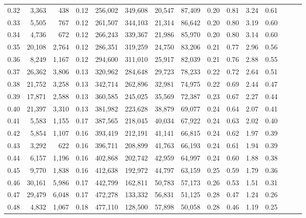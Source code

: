 \begin{tabular}{rrrrrrrrrrrrrrr}
0.32 &   3,363 &    438 &  0.12 &  256,002 &  349,608 &   20,547 &   87,409 &  0.20 &  0.81 &  3.24 &      0.61 \\
0.33 &   5,505 &    767 &  0.12 &  261,507 &  344,103 &   21,314 &   86,642 &  0.20 &  0.80 &  3.19 &      0.60 \\
0.34 &   4,736 &    672 &  0.12 &  266,243 &  339,367 &   21,986 &   85,970 &  0.20 &  0.80 &  3.14 &      0.60 \\
0.35 &  20,108 &  2,764 &  0.12 &  286,351 &  319,259 &   24,750 &   83,206 &  0.21 &  0.77 &  2.96 &      0.56 \\
0.36 &   8,249 &  1,167 &  0.12 &  294,600 &  311,010 &   25,917 &   82,039 &  0.21 &  0.76 &  2.88 &      0.55 \\
0.37 &  26,362 &  3,806 &  0.13 &  320,962 &  284,648 &   29,723 &   78,233 &  0.22 &  0.72 &  2.64 &      0.51 \\
0.38 &  21,752 &  3,258 &  0.13 &  342,714 &  262,896 &   32,981 &   74,975 &  0.22 &  0.69 &  2.44 &      0.47 \\
0.39 &  17,871 &  2,588 &  0.13 &  360,585 &  245,025 &   35,569 &   72,387 &  0.23 &  0.67 &  2.27 &      0.44 \\
0.40 &  21,397 &  3,310 &  0.13 &  381,982 &  223,628 &   38,879 &   69,077 &  0.24 &  0.64 &  2.07 &      0.41 \\
0.41 &   5,583 &  1,155 &  0.17 &  387,565 &  218,045 &   40,034 &   67,922 &  0.24 &  0.63 &  2.02 &      0.40 \\
0.42 &   5,854 &  1,107 &  0.16 &  393,419 &  212,191 &   41,141 &   66,815 &  0.24 &  0.62 &  1.97 &      0.39 \\
0.43 &   3,292 &    622 &  0.16 &  396,711 &  208,899 &   41,763 &   66,193 &  0.24 &  0.61 &  1.94 &      0.39 \\
0.44 &   6,157 &  1,196 &  0.16 &  402,868 &  202,742 &   42,959 &   64,997 &  0.24 &  0.60 &  1.88 &      0.38 \\
0.45 &   9,770 &  1,838 &  0.16 &  412,638 &  192,972 &   44,797 &   63,159 &  0.25 &  0.59 &  1.79 &      0.36 \\
0.46 &  30,161 &  5,986 &  0.17 &  442,799 &  162,811 &   50,783 &   57,173 &  0.26 &  0.53 &  1.51 &      0.31 \\
0.47 &  29,479 &  6,048 &  0.17 &  472,278 &  133,332 &   56,831 &   51,125 &  0.28 &  0.47 &  1.24 &      0.26 \\
0.48 &   4,832 &  1,067 &  0.18 &  477,110 &  128,500 &   57,898 &   50,058 &  0.28 &  0.46 &  1.19 &      0.25 \\

\end{tabular}
